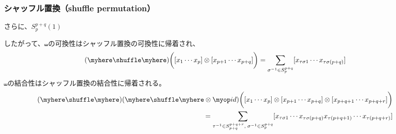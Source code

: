 {\subsubsection{シャッフル置換（shuffle permutation）}
\label{s3:シャッフル置換} %
	\begin{todo}[ここまで切り取り]\label{todo:ここまで切り取り} %
	\end{todo} %
	さらに、$S^{p+q}_p(1)$

	したがって、$\shuffle$の可換性はシャッフル置換の可換性に帰着され、
	\begin{equation*}\begin{split}
		(\myhere\shuffle\myhere)
			\biggl([x_1\cdots x_p]\otimes[x_{p+1}\cdots x_{p+q}]\biggr)
		= \sum_{\sigma^{-1}\in S^{p+q}_p}
			[x_{\tau\sigma1}\cdots x_{\tau\sigma(p+q)}] \\
	\end{split}\end{equation*}
	$\shuffle$の結合性はシャッフル置換の結合性に帰着される。
	\begin{equation*}\begin{split}
		(\myhere\shuffle\myhere)(\myhere\shuffle\myhere\otimes\id)
		\biggl([x_1\cdots x_p]\otimes[x_{p+1}\cdots x_{p+q}]
			\otimes[x_{p+q+1}\cdots x_{p+q+r}]\biggr) \\
		= \sum_{\tau^{-1}\in S^{p+q+r}_{p+q},\;\sigma^{-1}\in S^{p+q}_p}
		[x_{\tau\sigma1}\cdots x_{\tau\sigma(p+q)}
			x_{\tau(p+q+1)}\cdots x_{\tau(p+q+r)}]
	\end{split}\end{equation*}

}
